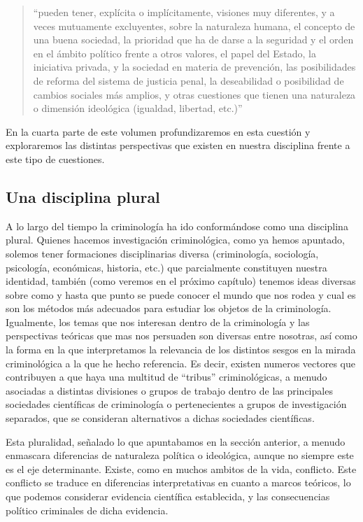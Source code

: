 \documentclass[
  spanish,
  letterpaper,
  DIV=11,
  numbers=noendperiod]{scrreprt}
\begin{document}
\begin{quote}
``pueden tener, explícita o implícitamente, visiones muy diferentes, y a
veces mutuamente excluyentes, sobre la naturaleza humana, el concepto de
una buena sociedad, la prioridad que ha de darse a la seguridad y el
orden en el ámbito político frente a otros valores, el papel del Estado,
la iniciativa privada, y la sociedad en materia de prevención, las
posibilidades de reforma del sistema de justicia penal, la deseabilidad
o posibilidad de cambios sociales más amplios, y otras cuestiones que
tienen una naturaleza o dimensión ideológica (igualdad, libertad,
etc.)''
\end{quote}

En la cuarta parte de este volumen profundizaremos en esta cuestión y
exploraremos las distintas perspectivas que existen en nuestra
disciplina frente a este tipo de cuestiones.

\subsection{Una disciplina plural}\label{una-disciplina-plural}

A lo largo del tiempo la criminología ha ido conformándose como una
disciplina plural. Quienes hacemos investigación criminológica, como ya
hemos apuntado, solemos tener formaciones disciplinarias diversa
(criminología, sociología, psicología, económicas, historia, etc.) que
parcialmente constituyen nuestra identidad, también (como veremos en el
próximo capítulo) tenemos ideas diversas sobre como y hasta que punto se
puede conocer el mundo que nos rodea y cual es son los métodos más
adecuados para estudiar los objetos de la criminología. Igualmente, los
temas que nos interesan dentro de la criminología y las perspectivas
teóricas que mas nos persuaden son diversas entre nosotras, así como la
forma en la que interpretamos la relevancia de los distintos sesgos en
la mirada criminológica a la que he hecho referencia. Es decir, existen
numeros vectores que contribuyen a que haya una multitud de ``tribus''
criminológicas, a menudo asociadas a distintas divisiones o grupos de
trabajo dentro de las principales sociedades científicas de criminología
o pertenecientes a grupos de investigación separados, que se consideran
alternativos a dichas sociedades científicas.

Esta pluralidad, señalado lo que apuntabamos en la sección anterior, a
menudo enmascara diferencias de naturaleza política o ideológica, aunque
no siempre este es el eje determinante. Existe, como en muchos ambitos
de la vida, conflicto. Este conflicto se traduce en diferencias
interpretativas en cuanto a marcos teóricos, lo que podemos considerar
evidencia científica establecida, y las consecuencias político
criminales de dicha evidencia.
\end{document}
